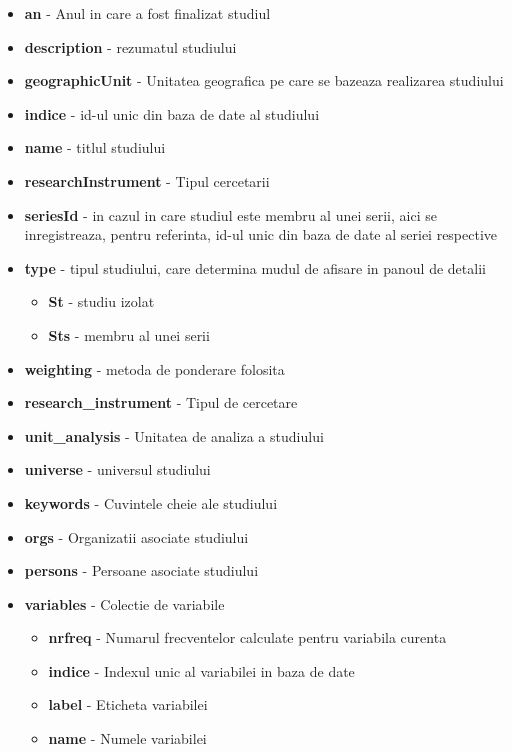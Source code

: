 \begin{itemize}
\item \textbf{an} - Anul in care a fost finalizat studiul 
\item \textbf{description} - rezumatul studiului 
\item \textbf{geographicUnit} - Unitatea geografica pe care se bazeaza realizarea
studiului 
\item \textbf{indice} - id-ul unic din baza de date al studiului 
\item \textbf{name} - titlul studiului 
\item \textbf{researchInstrument} - Tipul cercetarii 
\item \textbf{seriesId} - in cazul in care studiul este membru al unei serii,
aici se inregistreaza, pentru referinta, id-ul unic din baza de date
al seriei respective 
\item \textbf{type} - tipul studiului, care determina mudul de afisare in
panoul de detalii 

\begin{itemize}
\item \textbf{St} - studiu izolat 
\item \textbf{Sts} - membru al unei serii 
\end{itemize}
\item \textbf{weighting} - metoda de ponderare folosita 
\item \textbf{research\_instrument} - Tipul de cercetare 
\item \textbf{unit\_analysis} - Unitatea de analiza a studiului 
\item \textbf{universe} - universul studiului 
\item \textbf{keywords} - Cuvintele cheie ale studiului 
\item \textbf{orgs} - Organizatii asociate studiului 
\item \textbf{persons} - Persoane asociate studiului 
\item \textbf{variables} - Colectie de variabile 

\begin{itemize}
\item \textbf{nrfreq} - Numarul frecventelor calculate pentru variabila
curenta 
\item \textbf{indice} - Indexul unic al variabilei in baza de date 
\item \textbf{label }- Eticheta variabilei 
\item \textbf{name} - Numele variabilei 
\end{itemize}
\end{itemize}

